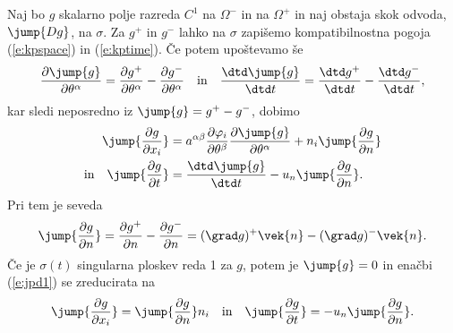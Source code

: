 Naj bo $g$ skalarno polje razreda $C^1$ na $\Omega^-$ in na $\Omega^+$ in naj
obstaja skok odvoda, $\jump{Dg}$, na $\sigma$.
Za $g^+$ in $g^-$ lahko na $\sigma$ zapišemo kompatibilnostna
pogoja (\ref{e:kpspace}) in (\ref{e:kptime}). Če potem upoštevamo še
\[
	\frac{\partial\jump{g}}{\partial\theta^{\alpha}}=
	\frac{\partial g^+}{\partial\theta^{\alpha}}-\frac{\partial g^-}{\partial\theta^{\alpha}}
	\quad\textrm{in}\quad
	\frac{\dtd\jump{g}}{\dtd t}=\frac{\dtd g^+}{\dtd t}-\frac{\dtd g^-}{\dtd t},
\]
kar sledi neposredno iz $\jump{g}=g^+-g^-$, dobimo
\begin{align}
	\jump{\frac{\partial g}{\partial x_i}}&=
	a^{\alpha\beta}\frac{\partial\varphi_i}{\partial\theta^{\beta}}
	\frac{\partial \jump{g}}{\partial\theta^{\alpha}}+
	n_i\jump{\frac{\partial g}{\partial n}}\nonumber\\
	\textrm{in}\quad\jump{\frac{\partial g}{\partial t}}&=
	\frac{\dtd \jump{g}}{\dtd t}-u_n\jump{\frac{\partial g}{\partial n}}.\label{e:jpd1}
\end{align}
Pri tem je seveda%
\[
	\jump{\frac{\partial g}{\partial n}}=\frac{\partial g^+}{\partial n}-
	\frac{\partial g^-}{\partial n}=(\grad g)^+\vek{n}-(\grad g)^-\vek{n}.
\]
Če je $\sigma(t)$ singularna ploskev reda 1 za $g$, potem je $\jump{g}=0$ in enačbi
(\ref{e:jpd1}) se zreducirata na
\[
	\jump{\frac{\partial g}{\partial x_i}}=\jump{\frac{\partial g}{\partial n}}n_i\quad\textrm{in}
	\quad \jump{\frac{\partial g}{\partial t}}=-u_n\jump{\frac{\partial g}{\partial n}}.
\]


